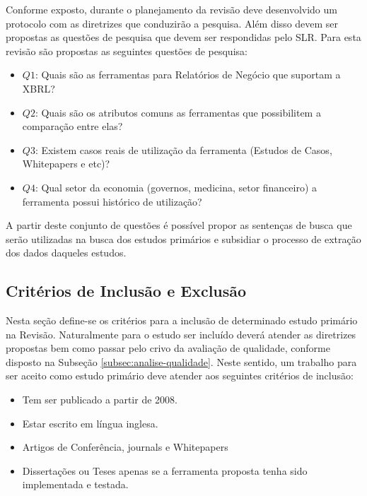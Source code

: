 \documentclass[12pt]{article}
\begin{document}
Conforme exposto, durante o planejamento da revisão deve desenvolvido um
protocolo com as diretrizes que conduzirão a pesquisa. Além disso devem ser
propostas as questões de pesquisa que devem ser respondidas pelo SLR. Para
esta revisão são propostas as seguintes questões de pesquisa:

\begin{itemize}

  \item \textbf{$Q1$}: Quais são as ferramentas para Relatórios de Negócio que
    suportam a XBRL?
  \item \textbf{$Q2$}: Quais são os atributos comuns as ferramentas
    que possibilitem a comparação entre elas?
  \item \textbf{$Q3$}: Existem casos reais de utilização da ferramenta
    (Estudos de Casos, Whitepapers e etc)?
  \item \textbf{$Q4$}: Qual setor da economia (governos, medicina, setor financeiro) a ferramenta possui histórico de utilização?

\end{itemize}
A partir deste conjunto de questões é possível propor as sentenças de busca que
serão utilizadas na busca dos estudos primários e subsidiar o processo de
extração dos dados daqueles estudos.

\subsection{Critérios de Inclusão e Exclusão}
\label{subsec:inclusao-exclusao}

Nesta seção define-se os critérios para a inclusão de determinado estudo
primário na Revisão. Naturalmente para o estudo ser incluído deverá atender as diretrizes propostas bem
como passar pelo crivo da avaliação de qualidade, conforme disposto na Subseção
\ref{subsec:analise-qualidade}. Neste sentido, um trabalho para ser aceito
como estudo primário deve atender aos seguintes critérios de inclusão:

\begin{itemize}

\item Tem ser publicado a partir de 2008.
\item Estar escrito em língua inglesa.
\item Artigos de Conferência, journals e Whitepapers
\item Dissertações ou Teses apenas se a ferramenta proposta tenha sido
  implementada e testada.
\end{itemize}
\end{document}
